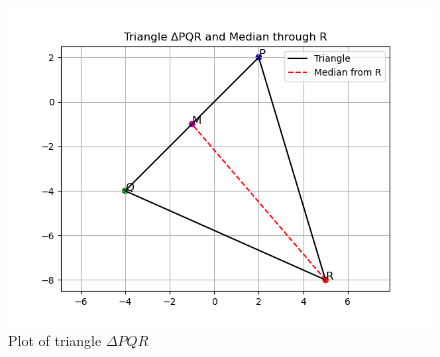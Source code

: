 \documentclass[journal]{IEEEtran}
\begin{document}
\begin{figure}[h!]
   \centering
   \includegraphics[width=0.7\linewidth]{figs/plot.png}
   \caption{Plot of triangle $\Delta PQR$}
   \label{}
\end{figure}
\end{document}
